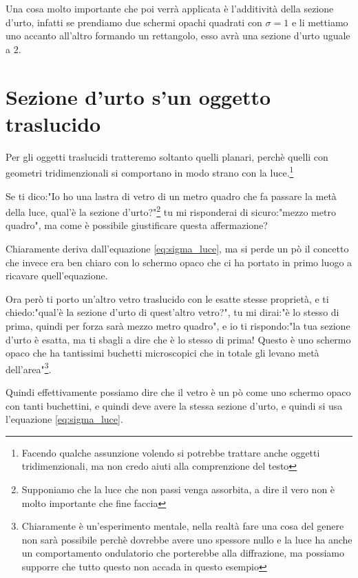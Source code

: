 \documentclass[11pt,a4paper]{report}
\begin{document}
		Una cosa molto importante che poi verrà applicata è l'additività della sezione d'urto, infatti se prendiamo due schermi opachi quadrati con $\sigma=1$ e li mettiamo uno accanto all'altro formando un rettangolo, esso avrà una sezione d'urto uguale a $2$.

	\section{Sezione d'urto s'un oggetto traslucido}
		Per gli oggetti traslucidi tratteremo soltanto quelli planari, perchè quelli con geometri tridimenzionali si comportano in modo strano con la luce.\footnote{Facendo qualche assunzione volendo si potrebbe trattare anche oggetti tridimenzionali, ma non credo aiuti alla comprenzione del testo}\newline

		Se ti dico:"Io ho una lastra di vetro di un metro quadro che fa passare la metà della luce, qual'è la sezione d'urto?"\footnote{Supponiamo che la luce che non passi venga assorbita, a dire il vero non è molto importante che fine faccia} tu mi risponderai di sicuro:"mezzo metro quadro", ma come è possibile giustificare questa affermazione?\newline

		Chiaramente deriva dall'equazione \ref{eq:sigma_luce}, ma si perde un pò il concetto che invece era ben chiaro con lo schermo opaco che ci ha portato in primo luogo a ricavare quell'equazione.\newline

		Ora però ti porto un'altro vetro traslucido con le esatte stesse proprietà, e ti chiedo:"qual'è la sezione d'urto di quest'altro vetro?", tu mi dirai:"è lo stesso di prima, quindi per forza sarà mezzo metro quadro", e io ti rispondo:"la tua sezione d'urto è esatta, ma ti sbagli a dire che è lo stesso di prima! Questo è uno schermo opaco che ha tantissimi buchetti microscopici che in totale gli levano metà dell'area"\footnote{Chiaramente è un'esperimento mentale, nella realtà fare una cosa del genere non sarà possibile perchè dovrebbe avere uno spessore nullo e la luce ha anche un comportamento ondulatorio che porterebbe alla diffrazione, ma possiamo supporre che tutto questo non accada in questo esempio}.\newline

		Quindi effettivamente possiamo dire che il vetro è un pò come uno schermo opaco con tanti buchettini, e quindi deve avere la stessa sezione d'urto, e quindi si usa l'equazione \ref{eq:sigma_luce}.\newline
\end{document}
